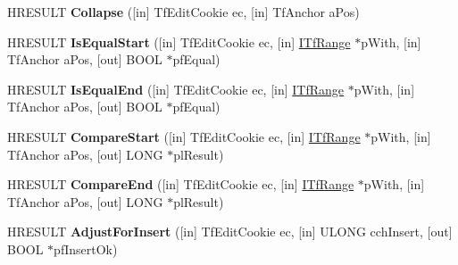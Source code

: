 \begin{DoxyCompactItemize}
\item 
\mbox{\label{interface_i_tf_range_a29af527955f90fac8dfe5081ade3c109}} 
H\+R\+E\+S\+U\+LT {\bfseries Collapse} (\mbox{[}in\mbox{]} Tf\+Edit\+Cookie ec, \mbox{[}in\mbox{]} Tf\+Anchor a\+Pos)
\item 
\mbox{\label{interface_i_tf_range_a3540d9cb7b844ef63b7160902a62a107}} 
H\+R\+E\+S\+U\+LT {\bfseries Is\+Equal\+Start} (\mbox{[}in\mbox{]} Tf\+Edit\+Cookie ec, \mbox{[}in\mbox{]} \hyperlink{interface_i_tf_range}{I\+Tf\+Range} $\ast$p\+With, \mbox{[}in\mbox{]} Tf\+Anchor a\+Pos, \mbox{[}out\mbox{]} B\+O\+OL $\ast$pf\+Equal)
\item 
\mbox{\label{interface_i_tf_range_ae22e2a77a5d57f8081a109e341bd0a4f}} 
H\+R\+E\+S\+U\+LT {\bfseries Is\+Equal\+End} (\mbox{[}in\mbox{]} Tf\+Edit\+Cookie ec, \mbox{[}in\mbox{]} \hyperlink{interface_i_tf_range}{I\+Tf\+Range} $\ast$p\+With, \mbox{[}in\mbox{]} Tf\+Anchor a\+Pos, \mbox{[}out\mbox{]} B\+O\+OL $\ast$pf\+Equal)
\item 
\mbox{\label{interface_i_tf_range_a2d4a710b41acbf267b88cf8a4bb86ace}} 
H\+R\+E\+S\+U\+LT {\bfseries Compare\+Start} (\mbox{[}in\mbox{]} Tf\+Edit\+Cookie ec, \mbox{[}in\mbox{]} \hyperlink{interface_i_tf_range}{I\+Tf\+Range} $\ast$p\+With, \mbox{[}in\mbox{]} Tf\+Anchor a\+Pos, \mbox{[}out\mbox{]} L\+O\+NG $\ast$pl\+Result)
\item 
\mbox{\label{interface_i_tf_range_a00ae6a110fd43eefe77a717c88ddaed4}} 
H\+R\+E\+S\+U\+LT {\bfseries Compare\+End} (\mbox{[}in\mbox{]} Tf\+Edit\+Cookie ec, \mbox{[}in\mbox{]} \hyperlink{interface_i_tf_range}{I\+Tf\+Range} $\ast$p\+With, \mbox{[}in\mbox{]} Tf\+Anchor a\+Pos, \mbox{[}out\mbox{]} L\+O\+NG $\ast$pl\+Result)
\item 
\mbox{\label{interface_i_tf_range_a23d35a1da7865e97dfa949dc6b07b36c}} 
H\+R\+E\+S\+U\+LT {\bfseries Adjust\+For\+Insert} (\mbox{[}in\mbox{]} Tf\+Edit\+Cookie ec, \mbox{[}in\mbox{]} U\+L\+O\+NG cch\+Insert, \mbox{[}out\mbox{]} B\+O\+OL $\ast$pf\+Insert\+Ok)
\item 
\mbox{\label{interface_i_tf_range_a894aa71e8f5fbcb552f82602c980140b}} 

\end{DoxyCompactItemize}
